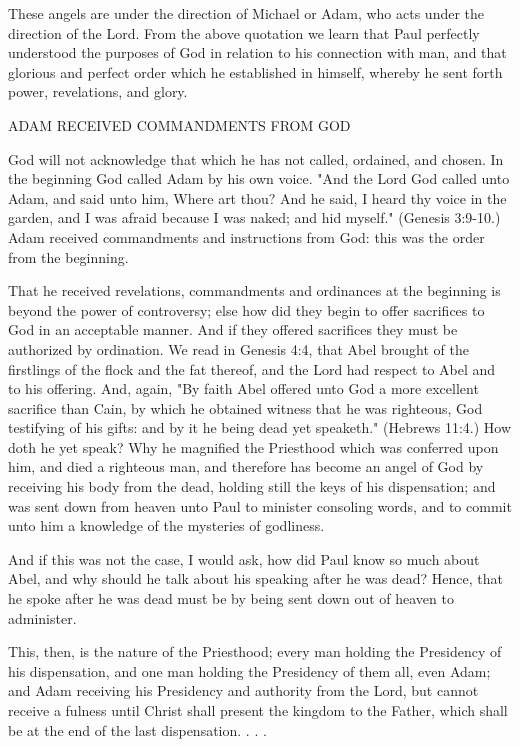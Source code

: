 These angels are under the direction of Michael or Adam, who acts under the direction of the
Lord. From the above quotation we learn that Paul perfectly understood the purposes of God
in relation to his connection with man, and that glorious and perfect order which he
established in himself, whereby he sent forth power, revelations, and glory.

ADAM RECEIVED COMMANDMENTS FROM GOD

God will not acknowledge that which he has not called, ordained, and chosen. In the
beginning God called Adam by his own voice. "And the Lord God called unto Adam, and
said unto him, Where art thou? And he said, I heard thy voice in the garden, and I was afraid
because I was naked; and hid myself." (Genesis 3:9-10.) Adam received commandments and
instructions from God: this was the order from the beginning.

That he received revelations, commandments and ordinances at the beginning is beyond the
power of controversy; else how did they begin to offer sacrifices to God in an acceptable
manner. And if they offered sacrifices they must be authorized by ordination. We read in
Genesis 4:4, that Abel brought of the firstlings of the flock and the fat thereof, and the Lord
had respect to Abel and to his offering. And, again, "By faith Abel offered unto God a more
excellent sacrifice than Cain, by which he obtained witness that he was righteous, God
testifying of his gifts: and by it he being dead yet speaketh." (Hebrews 11:4.) How doth he
yet speak? Why he magnified the Priesthood which was conferred upon him, and died a
righteous man, and therefore has become an angel of God by receiving his body from the
dead, holding still the keys of his dispensation; and was sent down from heaven unto Paul to
minister consoling words, and to commit unto him a knowledge of the mysteries of
godliness.

And if this was not the case, I would ask, how did Paul know so much about Abel, and why
should he talk about his speaking after he was dead? Hence, that he spoke after he was dead
must be by being sent down out of heaven to administer.

This, then, is the nature of the Priesthood; every man holding the Presidency of his
dispensation, and one man holding the Presidency of them all, even Adam; and Adam
receiving his Presidency and authority from the Lord, but cannot receive a fulness until
Christ shall present the kingdom to the Father, which shall be at the end of the last
dispensation. . . .

